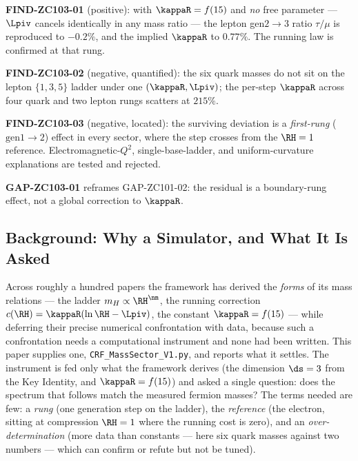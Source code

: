 \documentclass[12pt, a4paper]{article}
\begin{document}
\textbf{FIND-ZC103-01} (positive): with $\kappaR=f(15)$ and \emph{no} free
parameter --- $\Lpiv$ cancels identically in any mass ratio --- the lepton
gen$2{\to}3$ ratio $\tau/\mu$ is reproduced to $-0.2\%$, and the implied
$\kappaR$ to $0.77\%$. The running law is confirmed at that rung.

\textbf{FIND-ZC103-02} (negative, quantified): the six quark masses do not sit
on the lepton $\{1,3,5\}$ ladder under one $(\kappaR,\Lpiv)$; the per-step
$\kappaR$ across four quark and two lepton rungs scatters at $215\%$.

\textbf{FIND-ZC103-03} (negative, located): the surviving deviation is a
\emph{first-rung} ($\mathrm{gen}1{\to}2$) effect in every sector, where the step
crosses from the $\RH=1$ reference. Electromagnetic-$Q^2$, single-base-ladder,
and uniform-curvature explanations are tested and rejected.

\textbf{GAP-ZC103-01} reframes GAP-ZC101-02: the residual is a boundary-rung
effect, not a global correction to $\kappaR$.


\subsection{Background: Why a Simulator, and What It Is Asked}
\label{sec:background-zc103}

Across roughly a hundred papers the framework has derived the \emph{forms} of
its mass relations --- the ladder $m_H\propto\RH^{\nm}$, the running correction
$c(\RH)=\kappaR(\ln\RH-\Lpiv)$, the constant $\kappaR=f(15)$ --- while deferring
their precise numerical confrontation with data, because such a confrontation
needs a computational instrument and none had been written. This paper supplies
one, \texttt{CRF\_MassSector\_V1.py}, and reports what it settles. The instrument
is fed only what the framework derives (the dimension $\ds=3$ from the Key
Identity, and $\kappaR=f(15)$) and asked a single question: does the spectrum
that follows match the measured fermion masses? The terms needed are few: a
\emph{rung} (one generation step on the ladder), the \emph{reference} (the
electron, sitting at compression $\RH=1$ where the running cost is zero), and an
\emph{over-determination} (more data than constants --- here six quark masses
against two numbers --- which can confirm or refute but not be tuned).
\end{document}
